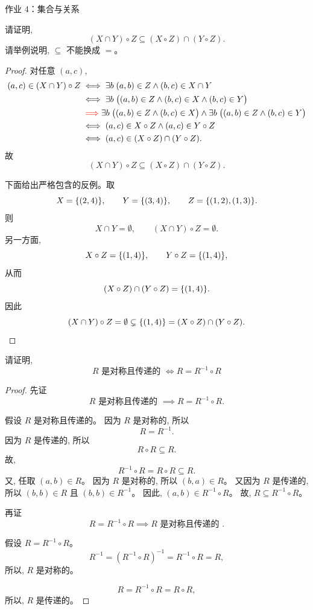 
\begin{frame}[allowframebreaks]{作业 4：集合与关系}

\begin{problem}[关系的运算]
  请证明,
  \[
    (X \cap Y) \circ Z \subseteq (X \circ Z) \cap (Y \circ Z).
  \]
  请举例说明, $\subseteq$ 不能换成 $=$。
\end{problem}

\begin{proof}
  对任意 $(a, c)$,
  \begin{align*}
    (a, c) \in (X \cap Y) \circ Z
      &\iff \exists b\; (a, b) \in Z \land (b, c) \in X \cap Y \\
      &\iff \exists b\; \big((a, b) \in Z \land (b, c) \in X \land (b, c) \in Y\big) \\
      &\;\textcolor{red}{\implies} \exists b\; \big((a, b) \in Z \land (b, c) \in X\big)
        \land \exists b\; \big((a, b) \in Z \land (b, c) \in Y\big) \\
      &\iff (a, c) \in X \circ Z \land (a, c) \in Y \circ Z \\
      &\iff (a, c) \in (X \circ Z) \cap (Y \circ Z).
  \end{align*}
  故
  \[
    (X \cap Y) \circ Z \subseteq (X \circ Z) \cap (Y \circ Z).
  \]

  下面给出严格包含的反例。取
  \[
    X = \{(2, 4)\},
    \qquad
    Y = \{(3, 4)\},
    \qquad
    Z = \{(1, 2), (1, 3)\}.
  \]
  则
  \[
    X \cap Y = \emptyset,
    \qquad
    (X \cap Y) \circ Z = \emptyset.
  \]
  另一方面,
  \[
    X \circ Z = \{(1, 4)\},
    \qquad
    Y \circ Z = \{(1, 4)\},
  \]
  从而
  \[
    (X \circ Z) \cap (Y \circ Z) = \{(1, 4)\}.
  \]
  因此
  \[
    (X \cap Y) \circ Z = \emptyset \subsetneq \{(1, 4)\} = (X \circ Z) \cap (Y \circ Z).
  \]
\end{proof}

\begin{problem}[关系的性质]
  请证明,
  \[
    R \text{ 是对称且传递的 } \iff R = R^{-1} \circ R
  \]
\end{problem}

\begin{proof}
  先证
  \[
    R \text{ 是对称且传递的 } \implies R = R^{-1} \circ R.
  \]

  假设 $R$ 是对称且传递的。
  因为 $R$ 是对称的, 所以
  \[
    R = R^{-1}.
  \]
  因为 $R$ 是传递的, 所以
  \[
    R \circ R \subseteq R.
  \]
  故,
  \[
    R^{-1} \circ R = R \circ R \subseteq R.
  \]
  又, 任取 $(a, b) \in R$。
  因为 $R$ 是对称的, 所以 $(b, a) \in R$。
  又因为 $R$ 是传递的, 所以 $(b, b) \in R$ 且 $(b, b) \in R^{-1}$。
  因此, $(a, b) \in R^{-1} \circ R$。
  故, $R \subseteq R^{-1} \circ R$。

  再证
  \[
     R = R^{-1} \circ R \implies R \text{ 是对称且传递的 }.
  \]

  假设 $R = R^{-1} \circ R$。
  \[
    R^{-1} = (R^{-1} \circ R)^{-1} = R^{-1} \circ R = R,
  \]
  所以, $R$ 是对称的。

  \[
    R = R^{-1} \circ R = R \circ R,
  \]
  所以, $R$ 是传递的。
\end{proof}

\end{frame}
